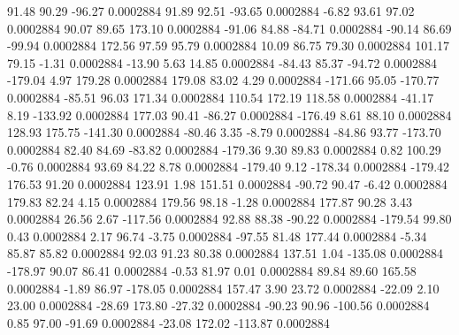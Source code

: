        91.48       90.29      -96.27     0.0002884
       91.89       92.51      -93.65     0.0002884
       -6.82       93.61       97.02     0.0002884
       90.07       89.65      173.10     0.0002884
      -91.06       84.88      -84.71     0.0002884
      -90.14       86.69      -99.94     0.0002884
      172.56       97.59       95.79     0.0002884
       10.09       86.75       79.30     0.0002884
      101.17       79.15       -1.31     0.0002884
      -13.90        5.63       14.85     0.0002884
      -84.43       85.37      -94.72     0.0002884
     -179.04        4.97      179.28     0.0002884
      179.08       83.02        4.29     0.0002884
     -171.66       95.05     -170.77     0.0002884
      -85.51       96.03      171.34     0.0002884
      110.54      172.19      118.58     0.0002884
      -41.17        8.19     -133.92     0.0002884
      177.03       90.41      -86.27     0.0002884
     -176.49        8.61       88.10     0.0002884
      128.93      175.75     -141.30     0.0002884
      -80.46        3.35       -8.79     0.0002884
      -84.86       93.77     -173.70     0.0002884
       82.40       84.69      -83.82     0.0002884
     -179.36        9.30       89.83     0.0002884
        0.82      100.29       -0.76     0.0002884
       93.69       84.22        8.78     0.0002884
     -179.40        9.12     -178.34     0.0002884
     -179.42      176.53       91.20     0.0002884
      123.91        1.98      151.51     0.0002884
      -90.72       90.47       -6.42     0.0002884
      179.83       82.24        4.15     0.0002884
      179.56       98.18       -1.28     0.0002884
      177.87       90.28        3.43     0.0002884
       26.56        2.67     -117.56     0.0002884
       92.88       88.38      -90.22     0.0002884
     -179.54       99.80        0.43     0.0002884
        2.17       96.74       -3.75     0.0002884
      -97.55       81.48      177.44     0.0002884
       -5.34       85.87       85.82     0.0002884
       92.03       91.23       80.38     0.0002884
      137.51        1.04     -135.08     0.0002884
     -178.97       90.07       86.41     0.0002884
       -0.53       81.97        0.01     0.0002884
       89.84       89.60      165.58     0.0002884
       -1.89       86.97     -178.05     0.0002884
      157.47        3.90       23.72     0.0002884
      -22.09        2.10       23.00     0.0002884
      -28.69      173.80      -27.32     0.0002884
      -90.23       90.96     -100.56     0.0002884
        0.85       97.00      -91.69     0.0002884
      -23.08      172.02     -113.87     0.0002884
